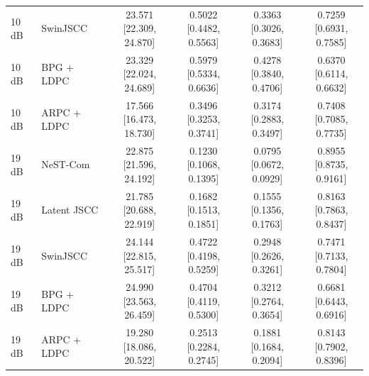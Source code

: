 \begin{tabular}{llcccc}
10 dB & SwinJSCC & \shortstack{23.571\\[22.309, 24.870]} & \shortstack{0.5022\\[0.4482, 0.5563]} & \shortstack{0.3363\\[0.3026, 0.3683]} & \shortstack{0.7259\\[0.6931, 0.7585]} \\
10 dB & BPG + LDPC & \shortstack{23.329\\[22.024, 24.689]} & \shortstack{0.5979\\[0.5334, 0.6636]} & \shortstack{0.4278\\[0.3840, 0.4706]} & \shortstack{0.6370\\[0.6114, 0.6632]} \\
10 dB & ARPC + LDPC & \shortstack{17.566\\[16.473, 18.730]} & \shortstack{0.3496\\[0.3253, 0.3741]} & \shortstack{0.3174\\[0.2883, 0.3497]} & \shortstack{0.7408\\[0.7085, 0.7735]} \\
\midrule
19 dB & NeST-Com & \shortstack{22.875\\[21.596, 24.192]} & \shortstack{0.1230\\[0.1068, 0.1395]} & \shortstack{0.0795\\[0.0672, 0.0929]} & \shortstack{0.8955\\[0.8735, 0.9161]} \\
19 dB & Latent JSCC & \shortstack{21.785\\[20.688, 22.919]} & \shortstack{0.1682\\[0.1513, 0.1851]} & \shortstack{0.1555\\[0.1356, 0.1763]} & \shortstack{0.8163\\[0.7863, 0.8437]} \\
19 dB & SwinJSCC & \shortstack{24.144\\[22.815, 25.517]} & \shortstack{0.4722\\[0.4198, 0.5259]} & \shortstack{0.2948\\[0.2626, 0.3261]} & \shortstack{0.7471\\[0.7133, 0.7804]} \\
19 dB & BPG + LDPC & \shortstack{24.990\\[23.563, 26.459]} & \shortstack{0.4704\\[0.4119, 0.5300]} & \shortstack{0.3212\\[0.2764, 0.3654]} & \shortstack{0.6681\\[0.6443, 0.6916]} \\
19 dB & ARPC + LDPC & \shortstack{19.280\\[18.086, 20.522]} & \shortstack{0.2513\\[0.2284, 0.2745]} & \shortstack{0.1881\\[0.1684, 0.2094]} & \shortstack{0.8143\\[0.7902, 0.8396]} \\
\bottomrule
\end{tabular}
